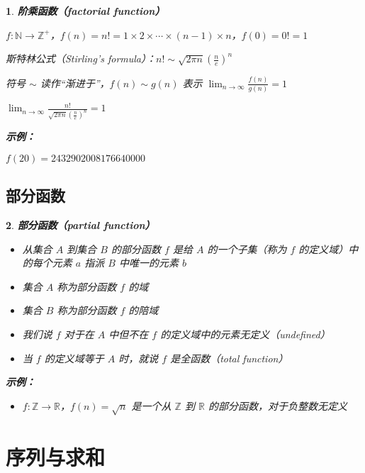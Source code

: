 \documentclass[UTF8]{report}
\theoremstyle{MyLineTheoremStyle} %
\theoremstyle{MyBlockTheoremStyle} %
\theoremstyle{MySubsubsectionStyle} %
\newtheorem{definition}{}
\begin{document}
\begin{definition}
    \textbf{阶乘函数（factorial function）}\par
    $f: \mathbb{N} \to \mathbb{Z}^+$，$f(n) = n! = 1 \times 2 \times \cdots \times (n-1) \times n$，$f(0) = 0! = 1$\par
    斯特林公式（Stirling’s formula）：$n! \sim \sqrt{2\pi n} \left(\frac{n}{e}\right)^n$\par
    符号 $\sim$ 读作“渐进于”，$f(n) \sim g(n)$ 表示 $\lim_{n \to \infty} \frac{f(n)}{g(n)} = 1$\par
    $\lim_{n \to \infty} \frac{n!}{\sqrt{2\pi n} \left(\frac{n}{e}\right)^n} = 1$\par

    \textbf{示例：}\par
    $f(20) = 2432902008176640000$\par
\end{definition}

\subsection{部分函数}

\begin{definition}
    \textbf{部分函数（partial function）}\par
    \begin{itemize}
        \item 从集合 $A$ 到集合 $B$ 的部分函数 $f$ 是给 $A$ 的一个子集（称为 $f$ 的定义域）中的每个元素 $a$ 指派 $B$ 中唯一的元素 $b$
        \item 集合 $A$ 称为部分函数 $f$ 的域
        \item 集合 $B$ 称为部分函数 $f$ 的陪域
        \item 我们说 $f$ 对于在 $A$ 中但不在 $f$ 的定义域中的元素无定义（undefined）
        \item 当 $f$ 的定义域等于 $A$ 时，就说 $f$ 是全函数（total function）
    \end{itemize}
    \textbf{示例：}\par
    \begin{itemize}
        \item $f: \mathbb{Z} \to \mathbb{R}$，$f(n) = \sqrt{n}$ 是一个从 $\mathbb{Z}$ 到 $\mathbb{R}$ 的部分函数，对于负整数无定义
    \end{itemize}
\end{definition}

\section{序列与求和}
\end{document}
